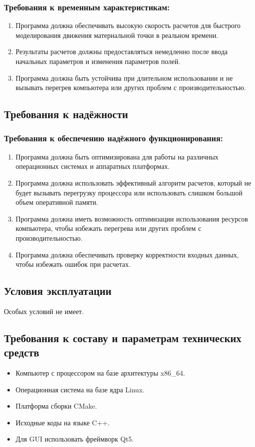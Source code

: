  \subsubsection{Требования к временным характеристикам:}

 \begin{enumerate}
  \item Программа должна обеспечивать высокую скорость расчетов для быстрого моделирования движения материальной точки в реальном времени.
  \item Результаты расчетов должны предоставляться немедленно после ввода начальных параметров и изменения параметров полей.
  \item Программа должна быть устойчива при длительном использовании и не вызывать перегрев компьютера или других проблем с производительностью.
 \end{enumerate}

 \subsection{Требования к надёжности}
 \subsubsection{Требования к обеспечению надёжного функционирования:}
 \begin{enumerate}
  \item Программа должна быть оптимизирована для работы на различных операционных системах и аппаратных платформах.
  \item Программа должна использовать эффективный алгоритм расчетов, который не будет вызывать перегрузку процессора или использовать слишком большой объем оперативной памяти.
  \item Программа должна иметь возможность оптимизации использования ресурсов компьютера, чтобы избежать перегрева или других проблем с производительностью.
  \item Программа должна обеспечивать проверку корректности входных данных, чтобы избежать ошибок при расчетах.
 \end{enumerate}

 \subsection{Условия эксплуатации} Особых условий не имеет.
 \subsection{Требования к составу и параметрам технических средств}
 \begin{itemize}
  \item  Компьютер с процессором на базе архитектуры x86\_64.
  \item  Операционная система на базе ядра Linux.
  \item  Платформа сборки CMake.
  \item  Исходные коды на языке C++.
  \item  Для GUI использовать фреймворк Qt5.
 \end{itemize}


